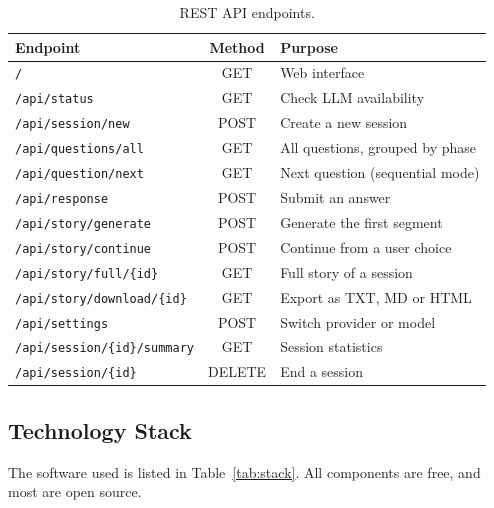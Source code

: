 \begin{table}[H]
\centering
\caption{REST API endpoints.}
\label{tab:rest}
\renewcommand{\arraystretch}{1.2}
\small
\begin{tabular}{|l|c|l|}
\hline
\textbf{Endpoint} & \textbf{Method} & \textbf{Purpose} \\
\hline
\texttt{/}                           & GET    & Web interface \\
\texttt{/api/status}                 & GET    & Check LLM availability \\
\texttt{/api/session/new}            & POST   & Create a new session \\
\texttt{/api/questions/all}          & GET    & All questions, grouped by phase \\
\texttt{/api/question/next}          & GET    & Next question (sequential mode) \\
\texttt{/api/response}               & POST   & Submit an answer \\
\texttt{/api/story/generate}         & POST   & Generate the first segment \\
\texttt{/api/story/continue}         & POST   & Continue from a user choice \\
\texttt{/api/story/full/\{id\}}      & GET    & Full story of a session \\
\texttt{/api/story/download/\{id\}}  & GET    & Export as TXT, MD or HTML \\
\texttt{/api/settings}               & POST   & Switch provider or model \\
\texttt{/api/session/\{id\}/summary} & GET    & Session statistics \\
\texttt{/api/session/\{id\}}         & DELETE & End a session \\
\hline
\end{tabular}
\end{table}

\subsection{Technology Stack}

The software used is listed in Table~\ref{tab:stack}. All components are free, and most are open source.


